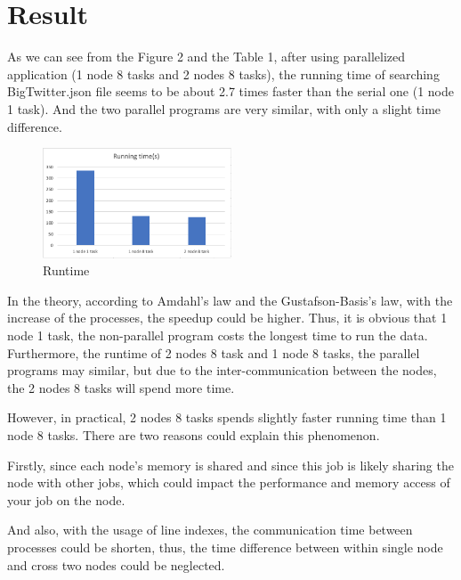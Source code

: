 \documentclass[11pt]{article}
\begin{document}
\section{Result}

As we can see from the Figure 2 and the Table 1, after using parallelized application (1 node 8 tasks and 2 nodes 8 tasks), the running time of searching BigTwitter.json file seems to be about 2.7 times faster than the serial one (1 node 1 task). And the two parallel programs are very similar, with only a slight time difference.
\begin{figure}[h]
\includegraphics[width=0.5\textwidth]{runtime_new}
\caption{Runtime}
\end{figure}

In the theory, according to Amdahl's law and the Gustafson-Basis’s law, with the increase of the processes, the speedup could be higher. Thus, it is obvious that 1 node 1 task, the non-parallel program costs the longest time to run the data. Furthermore, the runtime of 2 nodes 8 task and 1 node 8 tasks, the parallel programs may similar, but due to the inter-communication between the nodes, the 2 nodes 8 tasks will spend more time.

However, in practical, 2 nodes 8 tasks spends slightly faster running time than 1 node 8 tasks. There are two reasons could explain this phenomenon.

Firstly, since each node’s memory is shared and since this job is likely sharing the node with other jobs, which could impact the performance and memory access of your job on the node.

And also, with the usage of line indexes, the communication time between processes could be shorten, thus, the time difference between within single node and cross two nodes could be neglected.
\end{document}
